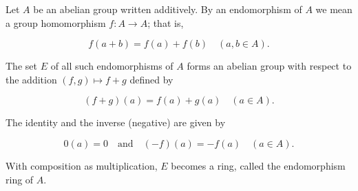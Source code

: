 Let $A$ be an abelian group written additively. By an endomorphism of $A$ we mean a group homomorphism $f: A \to A$; that is,

$$f(a + b) = f(a) + f(b) \quad (a, b \in A).$$

The set $E$ of all such endomorphisms of $A$ forms an abelian group with respect to the addition $(f, g) \mapsto f + g$ defined by

$$(f + g)(a) = f(a) + g(a) \quad (a \in A).$$

The identity and the inverse (negative) are given by

$$0(a) = 0 \quad \text{and} \quad (-f)(a) = -f(a) \quad (a \in A).$$

With composition as multiplication, $E$ becomes a ring, called the endomorphism ring of $A$.
